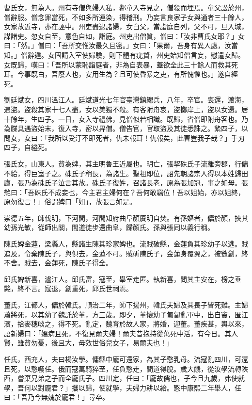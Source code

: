 \begin{pinyinscope}
曹氏女，無為人。州有寺僧與婦人私，鄰童入寺見之，僧殺而埋焉。童父訟於州，僧辭服。僧念罪當死，不如多所連染，得稽刑。乃妄言良家子女與通者三十餘人，女家故近寺，亦在誣中。州吏盡逮諸婦，女白父，當詣庭自列，父不可，旦入城，謀諸吏。忽女自至，意色自如，詣庭。州吏出僧質，僧曰：「汝非曹氏女耶？」女曰：「然。」僧曰：「吾所交惟汝最久且密。」女曰：「果爾，吾身有異人處，汝當知。」僧辭遁。女固請入室使婦驗，則下體有疣贅，州吏始知僧言妄，慰遣女歸。女既歸，嘆曰：「吾所以蒙恥詣庭者，非為自表暴，蓋欲全此三十餘人而救其死耳。今事既白，吾廢人也，安用生為？且可使昏暴之吏，有所愧懼也。」遂自經死。

劉廷斌女，四川溫江人。廷斌道光七年官臺灣鎮總兵，八年，卒官。喪還，渡海，遇盜。盜殺其家十七人盡，女以美獨不殺。有客附舟哀，盜擲岸上，盜以女還。居十餘年，生四子。一日，女入寺禮佛，見僧似若相識。既歸，省僧即附舟客也。乃為牒具遇盜始末，復入寺，密以畀僧。僧告官，官取盜及其徒悉誅之。縶四子，以問女，女曰：「我所以受汙不即死者，仇未報耳！仇報矣，此曹豈我子哉？」手刃四子，自縊死。

張氏女，山東人。貧為婢，其主明魯王近屬也。明亡，張挈硃氏子流離旁郡，行傭不給，得巨室子之。硃氏子稍長，為諸生。聖祖即位，詔先朝諸宗人得以本姓歸田廬，張乃為硃氏子泣言其故。硃氏子復姓，召諸長老，原為張加冠，事之如母。張艴曰：「吾硃氏不成妾也，今主君主婦何在？吾何敢竊位！吾以姐始，亦以姐終，原勿復言！」俗謂婢曰「姐」，故張言如是。

崇德五年，師伐明，下河間，河間知府曲阜顏賡明自焚。有孫嫗者，傭於顏，挾其幼孫光敏，從師出關，間道徒步還曲阜，歸顏氏。孫與張同以義行稱。

陳氏婢金蓮，梁縣人，縣諸生陳其珍家婢也。流賊破縣，金蓮負其珍幼子以逃。賊追及，令棄陳氏子，與俱去，金蓮不可。賊斫陳氏子，金蓮身覆翼之，被數創，終不舍。賊去，金蓮死，陳氏子得全。

邱氏婢新喜，瀘江人。邱氏富，寇至，舉室走匿。執新喜，問其主安在，榜之垂斃，終不言。寇退，創重死，邱氏世祠焉。

董氏，江都人，傭於韓氏。順治二年，師下揚州，韓氏夫婦及其長子皆死難。主婦蕭將死，以其幼子魏託於董，方三歲。即夕，董懷幼子匍匐亂軍中，出自竇，匿江濱，拾麥穗啖之，得不死。亂定，魏育於故人家，將婚，迎董。董疾甚，輿以來，語新婦曰：「媼病且死，不復見爾夫婦！爾夫昔抱持從萬死中活，有今日。其人賢，雖貧勿憂，後且大，毋效世俗兒女子，易爾夫也！」

任氏，西充人，夫曰楊汝學。傭縣中龐可還家，為其子憼乳母。流寇亂四川，可還且死，以憼囑任。俄而寇萬騎猝至，任負憼走，間道得脫。歲大饑，從汝學流轉陜西，嘗棄兄弟之子而全龐氏子。四川定，任曰：「龐故儒也，子今且九歲，弗使就學，吾何以對龐君？」攜以歸，使就學，夫婦力耕以給。憼中康熙二年舉人，任曰：「吾乃今無媿於龐君！」尋卒。


\end{pinyinscope}
